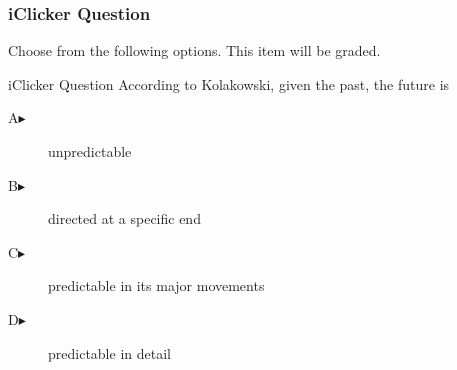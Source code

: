\begin{frame}
  \frametitle{iClicker Question}
Choose from the following options. This item will be graded.
\begin{block}{iClicker Question}
According to Kolakowski, given the past, the future is
\end{block}
\begin{description}
\item[A\hspace{.2in}$\blacktriangleright$] unpredictable
\item[B\hspace{.2in}$\blacktriangleright$] directed at a specific end
\item[C\hspace{.2in}$\blacktriangleright$] predictable in its major movements
\item[D\hspace{.2in}$\blacktriangleright$] predictable in detail
\end{description}
\end{frame}
